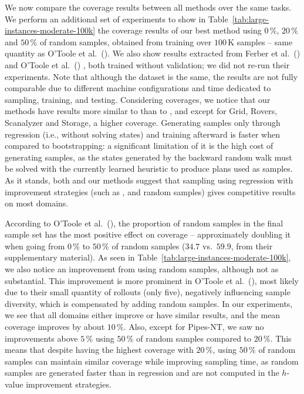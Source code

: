 We now compare the coverage results between all methods over the same tasks. We perform an additional set of experiments to show in Table~\ref{tab:large-instances-moderate-100k} the coverage results of our best method using $0\,\%$, $20\,\%$ and $50\,\%$ of random samples, obtained from training over $100$\,K samples -- same quantity as O'Toole et al.~(\citeyear{OToole/2022}). We also show results extracted from Ferber et al.~(\citeyear{Ferber.etal/2022}) \hboot and O'Toole et al.~(\citeyear{OToole/2022}) \hnrsl, both trained without validation; we did not re-run their experiments. Note that although the dataset is the same, the results are not fully comparable due to different machine configurations and time dedicated to sampling, training, and testing. Considering coverages, we notice that our methods have results more similar to \hnrsl than to \hboot, and except for Grid, Rovers, Scanalyzer and Storage, a higher coverage. Generating samples only through regression (i.e., without solving states) and training afterward is faster when compared to bootstrapping: a significant limitation of it is the high cost of generating samples, as the states generated by the backward random walk must be solved with the currently learned heuristic to produce plans used as samples. As it stands, both \hnrsl and our methods suggest that sampling using regression with improvement strategies (such as \hmin, \hvfc and random samples) gives competitive results on most domains.



According to O'Toole et al.~(\citeyear{OToole/2022}), the proportion of random samples in the final sample set has the most positive effect on coverage -- approximately doubling it when going from $0\,\%$ to $50\,\%$ of random samples ($34.7$ vs.~$59.9$, from their supplementary material). As seen in Table~\ref{tab:large-instances-moderate-100k}, we also notice an improvement from using random samples, although not as substantial. This improvement is more prominent in O'Toole et al.~(\citeyear{OToole/2022}), most likely due to their small quantity of rollouts (only five), negatively influencing sample diversity, which is compensated by adding random samples. In our experiments, we see that all domains either improve or have similar results, and the mean coverage improves by about $10\,\%$. Also, except for Pipes-NT, we saw no improvements above $5\,\%$ using $50\,\%$ of random samples compared to $20\,\%$. This means that despite having the highest coverage with $20\,\%$, using $50\,\%$ of random samples can maintain similar coverage while improving sampling time, as random samples are generated faster than in regression and are not computed in the $h$-value improvement strategies.
